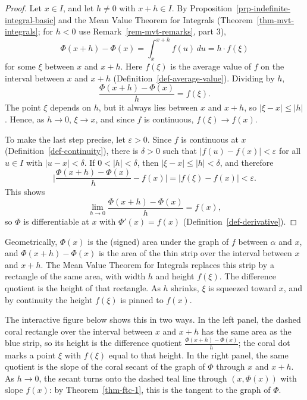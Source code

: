 \documentclass[
  letterpaper,
  DIV=11,
  numbers=noendperiod]{scrreprt}
\theoremstyle{plain}
\theoremstyle{plain}
\theoremstyle{definition}
\theoremstyle{definition}
\theoremstyle{definition}
\theoremstyle{plain}
\theoremstyle{plain}
\theoremstyle{remark}
\begin{document}
\begin{proof}
Let \(x\in I\), and let \(h\neq0\) with \(x+h\in I\). By
Proposition~\ref{prp-indefinite-integral-basic} and the Mean Value
Theorem for Integrals (Theorem~\ref{thm-mvt-integrals}; for \(h<0\) use
Remark~\ref{rem-mvt-remarks}, part 3), \[
\Phi(x+h) - \Phi(x) = \int_x^{x+h} f(u)\,du = h\cdot f(\xi)
\] for some \(\xi\) between \(x\) and \(x+h\). Here \(f(\xi)\) is the
average value of \(f\) on the interval between \(x\) and \(x+h\)
(Definition~\ref{def-average-value}). Dividing by \(h\), \[
\frac{\Phi(x+h)-\Phi(x)}{h} = f(\xi).
\] The point \(\xi\) depends on \(h\), but it always lies between \(x\)
and \(x+h\), so \(\lvert \xi-x \rvert\le\lvert h \rvert\). Hence, as
\(h\to0\), \(\xi\to x\), and since \(f\) is continuous,
\(f(\xi)\to f(x)\).

To make the last step precise, let \(\varepsilon>0\). Since \(f\) is
continuous at \(x\) (Definition~\ref{def-continuity}), there is
\(\delta>0\) such that \(\lvert f(u)-f(x) \rvert<\varepsilon\) for all
\(u\in I\) with \(\lvert u-x \rvert<\delta\). If
\(0<\lvert h \rvert<\delta\), then
\(\lvert \xi-x \rvert\le\lvert h \rvert<\delta\), and therefore \[
\lvert \frac{\Phi(x+h)-\Phi(x)}{h} - f(x) \rvert = \lvert f(\xi) - f(x) \rvert < \varepsilon.
\] This shows \[
\lim_{h\to0}\frac{\Phi(x+h)-\Phi(x)}{h} = f(x),
\] so \(\Phi\) is differentiable at \(x\) with \(\Phi'(x)=f(x)\)
(Definition~\ref{def-derivative}).
\end{proof}

Geometrically, \(\Phi(x)\) is the (signed) area under the graph of \(f\)
between \(\alpha\) and \(x\), and \(\Phi(x+h)-\Phi(x)\) is the area of
the thin strip over the interval between \(x\) and \(x+h\). The Mean
Value Theorem for Integrals replaces this strip by a rectangle of the
same area, with width \(h\) and height \(f(\xi)\). The difference
quotient is the height of that rectangle. As \(h\) shrinks, \(\xi\) is
squeezed toward \(x\), and by continuity the height \(f(\xi)\) is pinned
to \(f(x)\).

The interactive figure below shows this in two ways. In the left panel,
the dashed coral rectangle over the interval between \(x\) and \(x+h\)
has the same area as the blue strip, so its height is the difference
quotient \(\frac{\Phi(x+h)-\Phi(x)}{h}\); the coral dot marks a point
\(\xi\) with \(f(\xi)\) equal to that height. In the right panel, the
same quotient is the slope of the coral secant of the graph of \(\Phi\)
through \(x\) and \(x+h\). As \(h\to0\), the secant turns onto the
dashed teal line through \((x,\Phi(x))\) with slope \(f(x)\): by
Theorem~\ref{thm-ftc-1}, this is the tangent to the graph of \(\Phi\).
\end{document}
